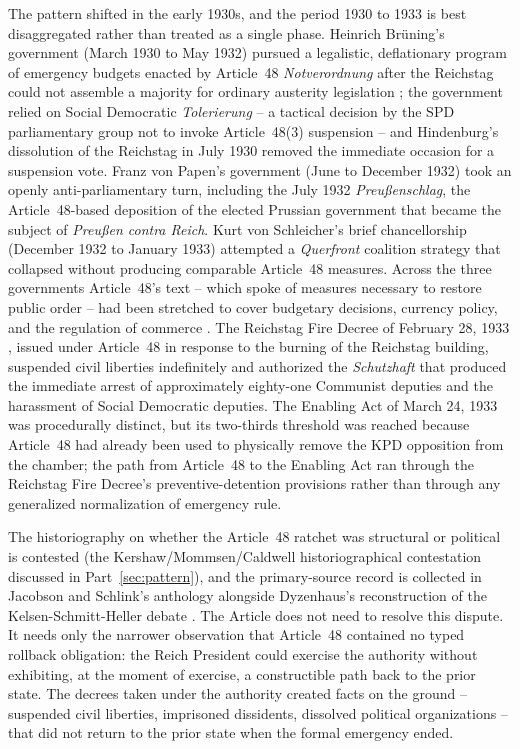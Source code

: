 The pattern shifted in the early 1930s, and the period 1930 to 1933 is best disaggregated rather than
treated as a single phase.
Heinrich Br\"uning's government (March 1930 to May 1932) pursued a legalistic, deflationary program of
emergency budgets enacted by Article~48 \emph{Notverordnung} after the Reichstag could not assemble a
majority for ordinary austerity legislation \cite{ref_bruening_notverordnung_1931}; the government
relied on Social Democratic \emph{Tolerierung} -- a tactical decision by the SPD parliamentary group not
to invoke Article~48(3) suspension -- and Hindenburg's dissolution of the Reichstag in July 1930
removed the immediate occasion for a suspension vote.
Franz von Papen's government (June to December 1932) took an openly anti-parliamentary turn, including
the July 1932 \emph{Preu{\ss}enschlag}, the Article~48-based deposition of the elected Prussian
government that became the subject of \emph{Preu{\ss}en contra Reich}.
Kurt von Schleicher's brief chancellorship (December 1932 to January 1933) attempted a \emph{Querfront}
coalition strategy that collapsed without producing comparable Article~48 measures.
Across the three governments Article~48's text -- which spoke of measures necessary to restore
public order -- had been stretched to cover budgetary decisions, currency policy, and the regulation of
commerce \cite{ref_caldwell_popular_sovereignty,ref_mommsen_weimar}.
The Reichstag Fire Decree of February 28, 1933 \cite{ref_reichstag_fire_decree_1933}, issued under
Article~48 in response to the burning of the Reichstag building, suspended civil liberties indefinitely
and authorized the \emph{Schutzhaft} that produced the immediate arrest of approximately eighty-one
Communist deputies and the harassment of Social Democratic deputies.
The Enabling Act of March 24, 1933 \cite{ref_enabling_act_1933} was procedurally distinct, but its
two-thirds threshold was reached because Article~48 had already been used to physically remove the KPD
opposition from the chamber; the path from Article~48 to the Enabling Act ran through the Reichstag Fire
Decree's preventive-detention provisions rather than through any generalized normalization of
emergency rule.

The historiography on whether the Article~48 ratchet was structural or political is contested
(the Kershaw/Mommsen/Caldwell historiographical contestation discussed in Part~\ref{sec:pattern}),
and the primary-source record is collected in Jacobson and Schlink's anthology
\cite{ref_jacobson_schlink_weimar} alongside Dyzenhaus's reconstruction of the
Kelsen-Schmitt-Heller debate \cite{ref_dyzenhaus_legality_legitimacy}.
The Article does not need to resolve this dispute.
It needs only the narrower observation that Article~48 contained no typed rollback obligation:
the Reich President could exercise the authority without exhibiting, at the moment of exercise,
a constructible path back to the prior state.
The decrees taken under the authority created facts on the ground -- suspended civil liberties,
imprisoned dissidents, dissolved political organizations -- that did not return to the prior state
when the formal emergency ended.

